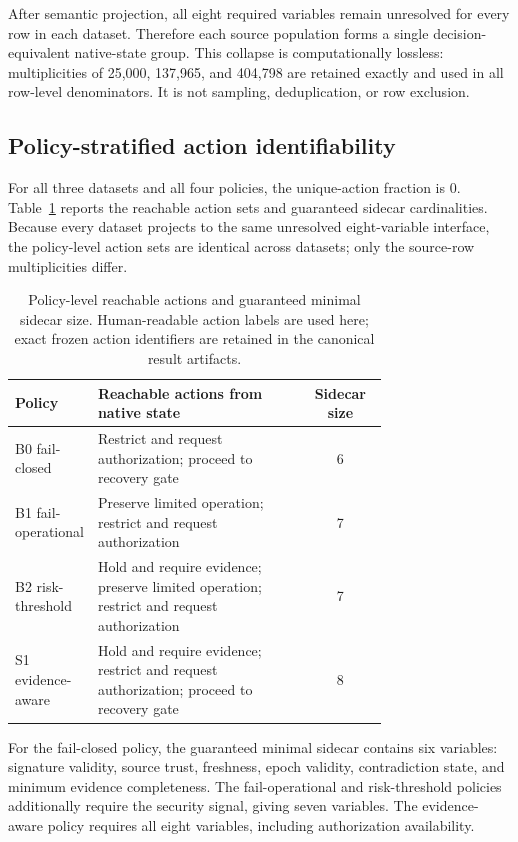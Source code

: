 \documentclass[preprint,12pt]{elsarticle}
\begin{document}
After semantic projection, all eight required variables remain unresolved for every row in each dataset. Therefore each source population forms a single decision-equivalent native-state group. This collapse is computationally lossless: multiplicities of 25,000, 137,965, and 404,798 are retained exactly and used in all row-level denominators. It is not sampling, deduplication, or row exclusion.

\subsection{Policy-stratified action identifiability}

For all three datasets and all four policies, the unique-action fraction is 0. Table~\ref{tab:policies} reports the reachable action sets and guaranteed sidecar cardinalities. Because every dataset projects to the same unresolved eight-variable interface, the policy-level action sets are identical across datasets; only the source-row multiplicities differ.

\begin{table}[htbp]
\centering
\small
\caption{Policy-level reachable actions and guaranteed minimal sidecar size. Human-readable action labels are used here; exact frozen action identifiers are retained in the canonical result artifacts.}
\label{tab:policies}
\begin{tabular}{>{\raggedright\arraybackslash}p{0.18\linewidth}>{\raggedright\arraybackslash}p{0.56\linewidth}c}
\toprule
Policy & Reachable actions from native state & Sidecar size \\
\midrule
B0 fail-closed &
Restrict and request authorization; proceed to recovery gate & 6 \\
B1 fail-operational &
Preserve limited operation; restrict and request authorization & 7 \\
B2 risk-threshold &
Hold and require evidence; preserve limited operation; restrict and request authorization & 7 \\
S1 evidence-aware &
Hold and require evidence; restrict and request authorization; proceed to recovery gate & 8 \\
\bottomrule
\end{tabular}
\end{table}

For the fail-closed policy, the guaranteed minimal sidecar contains six variables: signature validity, source trust, freshness, epoch validity, contradiction state, and minimum evidence completeness. The fail-operational and risk-threshold policies additionally require the security signal, giving seven variables. The evidence-aware policy requires all eight variables, including authorization availability.
\end{document}
